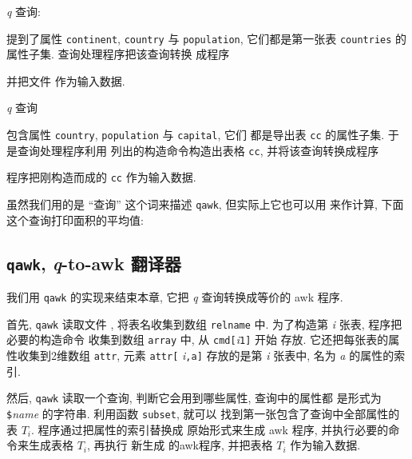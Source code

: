 \textit{q} 查询:
提到了属性 \texttt{continent}, \texttt{country} 与 \texttt{population},
它们都是第一张表 \texttt{countries} 的属性子集. 查询处理程序把该查询转换
成程序 
并把文件  作为输入数据.

\textit{q} 查询 
包含属性 \texttt{country}, \texttt{population} 与 \texttt{capital}, 它们 
都是导出表 \texttt{cc} 的属性子集. 于是查询处理程序利用 
列出的构造命令构造出表格 \texttt{cc}, 并将该查询转换成程序
程序把刚构造而成的 \texttt{cc} 作为输入数据.

虽然我们用的是 ``查询'' 这个词来描述 \texttt{qawk}, 但实际上它也可以用
来作计算, 下面这个查询打印面积的平均值:

\subsection{\texttt{qawk}, \textit{q}-to-awk 翻译器}
\label{subsec:qawk_a_q_to_awk_translator}

我们用 \texttt{qawk} 的实现来结束本章, 它把 \textit{q} 查询转换成等价的
awk 程序.

首先, \texttt{qawk} 读取文件 , 将表名收集到数组 
\texttt{relname} 中. 为了构造第 \textit{i} 张表, 程序把必要的构造命令
收集到数组 \texttt{array} 中, 从 \texttt{cmd[}\textit{i}\texttt{1]} 开始
存放. 它还把每张表的属性收集到2维数组 \texttt{attr}, 元素 \texttt{attr[}
\textit{i}\texttt{,}\texttt{a}\texttt{]} 存放的是第 \textit{i} 张表中,
名为 \textit{a} 的属性的索引.

然后, \texttt{qawk} 读取一个查询, 判断它会用到哪些属性, 查询中的属性都
是形式为 \verb'$'\textit{name} 的字符串. 利用函数 \texttt{subset}, 就可以 
找到第一张包含了查询中全部属性的表 $T_i$. 程序通过把属性的索引替换成
原始形式来生成 awk 程序, 并执行必要的命令来生成表格 $T_i$, 再执行 新生成
的awk程序, 并把表格 $T_i$ 作为输入数据.


